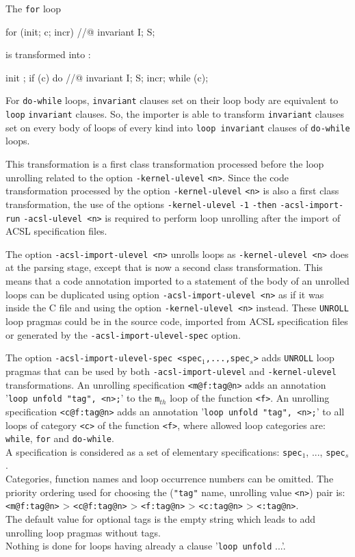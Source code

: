 \documentclass{frama-c-book}
\begin{document}
The \verb|for| loop
\begin{shell}
  for (init; c; incr)
    //@ invariant I;
    S;
\end{shell}
is transformed into :
\begin{shell}
  init ;
  if (c)
    do //@ invariant I;
    { S;
      incr;
    } while (c);
\end{shell}

For \verb|do-while| loops, \verb|invariant| clauses set on their loop body are equivalent to \verb|loop| \verb|invariant| clauses.
So, the importer is able to transform \verb|invariant| clauses set on every body of loops of every kind into \verb|loop invariant| clauses of \verb|do-while| loops.

This transformation is a first class transformation processed before the loop unrolling related to the option \verb|-kernel-ulevel| \verb|<n>|.
Since the code transformation processed by the option \verb|-kernel-ulevel| \verb|<n>| is also a first class transformation, the use of the options \verb|-kernel-ulevel| \verb|-1| {\tt <acsl-import-options>} \verb|-then| \verb|-acsl-import-run| \verb|-acsl-ulevel <n>| is required to perform loop unrolling after the import of ACSL specification files.

The option \verb|-acsl-import-ulevel <n>| unrolls loops as \verb|-kernel-ulevel <n>| does at the parsing stage, except that is now a second class transformation.
This means that a code annotation imported to a statement of the body of an unrolled loops can be duplicated using option \verb|-acsl-import-ulevel <n>| as if it was inside the C file and using the option \verb|-kernel-ulevel <n>| instead.
These \verb|UNROLL| loop pragmas could be in the source code, imported from ACSL specification files or generated by the {\tt\/-acsl-import-ulevel-spec} option.

The option {\tt\/-acsl-import-ulevel-spec <spec$_{1}$,...,spec$_{s}$>} adds \verb|UNROLL| loop pragmas that can be used by both  \verb|-acsl-import-ulevel| and \verb|-kernel-ulevel| transformations.
An unrolling specification \verb|<m@f:tag@n>| adds an annotation '{\tt\/loop unfold "tag", <n>;}' to the {\tt m$_{th}$} loop of the function \verb|<f>|.
An unrolling specification \verb|<c@f:tag@n>| adds an annotation '{\tt\/loop unfold "tag", <n>;}' to all loops of category \verb|<c>| of the function \verb|<f>|, where allowed loop categories are: \verb|while|, \verb|for| and \verb|do-while|.\\
A specification is considered as a set of elementary specifications: {\tt\/spec$_{1}$}, ..., {\tt\/spec$_{s}$}.\\
Categories, function names and loop occurrence numbers can be omitted.
The priority ordering used for choosing the (\verb|"tag"| name, unrolling value \verb|<n>|) pair is: \verb|<m@f:tag@n>| > \verb|<c@f:tag@n>| > \verb|<f:tag@n>| > \verb|<c:tag@n>| > \verb|<:tag@n>|.\\
The default value for optional tags is the empty string which leads to add unrolling loop pragmas without tags.\\
Nothing is done for loops having already a clause '{\tt\/loop unfold} ...'.\\
\end{document}
